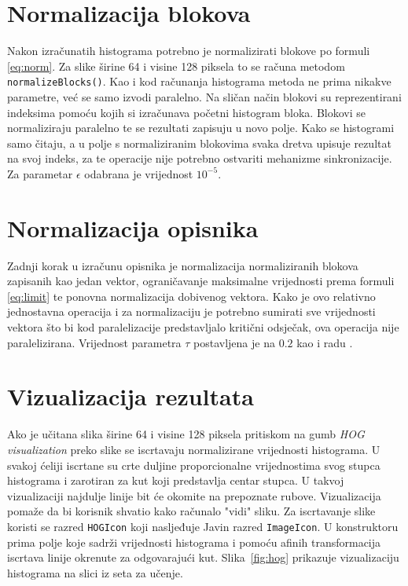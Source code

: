 \documentclass[times, utf8, zavrsni]{fer}
\begin{document}
\section{Normalizacija blokova}
Nakon izračunatih histograma potrebno je normalizirati blokove po formuli \ref{eq:norm}. Za slike širine 64 i visine 128 piksela to se računa metodom \verb|normalizeBlocks()|. Kao i kod računanja histograma metoda ne prima nikakve parametre, već se samo izvodi paralelno. Na sličan način blokovi su reprezentirani indeksima pomoću kojih si izračunava početni histogram bloka. Blokovi se normaliziraju paralelno te se rezultati zapisuju u novo polje. Kako se histogrami samo čitaju, a u polje s normaliziranim blokovima svaka dretva upisuje rezultat na svoj indeks, za te operacije nije potrebno ostvariti mehanizme sinkronizacije. Za parametar $\epsilon$ odabrana je vrijednost \(10^{-5}\).

\section{Normalizacija opisnika}
Zadnji korak u izračunu opisnika je normalizacija normaliziranih blokova zapisanih kao jedan vektor, ograničavanje maksimalne vrijednosti prema formuli \ref{eq:limit} te ponovna normalizacija dobivenog vektora. Kako je ovo relativno jednostavna operacija i za normalizaciju je potrebno sumirati sve vrijednosti vektora što bi kod paralelizacije predstavljalo kritični odsječak, ova operacija nije paralelizirana. Vrijednost parametra $\tau$ postavljena je na \(0.2\) kao i radu \cite{tomasi2012histograms}.

\section{Vizualizacija rezultata}
Ako je učitana slika širine 64 i visine 128 piksela pritiskom na gumb \textit{HOG visualization} preko slike se iscrtavaju normalizirane vrijednosti histograma. U svakoj ćeliji iscrtane su crte duljine proporcionalne vrijednostima svog stupca histograma i zarotiran za kut koji predstavlja centar stupca. U takvoj vizualizaciji najdulje linije bit će okomite na prepoznate rubove. Vizualizacija pomaže da bi korisnik shvatio kako računalo "vidi" sliku. Za iscrtavanje slike koristi se razred \verb|HOGIcon| koji nasljeđuje Javin razred \verb|ImageIcon|. U konstruktoru prima polje koje sadrži vrijednosti histograma i pomoću afinih transformacija iscrtava linije okrenute za odgovarajući kut. Slika~\ref{fig:hog} prikazuje vizualizaciju histograma na slici iz seta za učenje.
\end{document}
